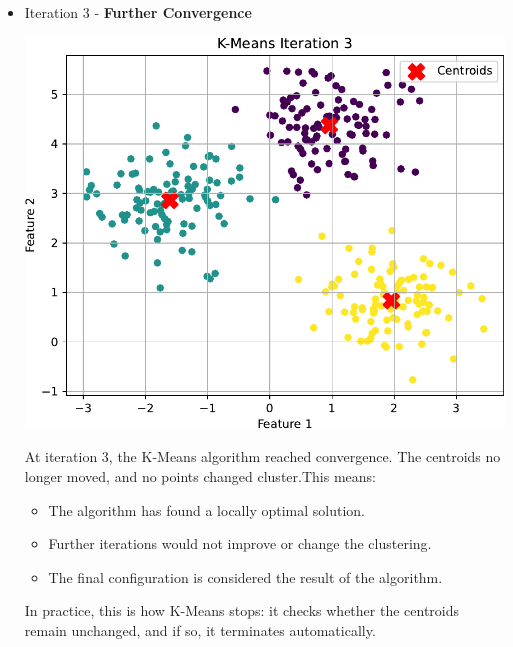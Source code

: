 \begin{examplebox}[: K-Means]
\begin{itemize}
        \item Iteration 3 - \textbf{Further Convergence}
        \begin{center}
            \includegraphics[width=.7\textwidth]{img/k-means/iter_3.pdf}
        \end{center}
        At iteration 3, the K-Means algorithm reached convergence. The centroids no longer moved, and no points changed cluster.This means:
        \begin{itemize}
            \item The algorithm has found a locally optimal solution.
            \item Further iterations would not improve or change the clustering.
            \item The final configuration is considered the result of the algorithm.
        \end{itemize}
        In practice, this is how K-Means stops: it checks whether the centroids remain unchanged, and if so, it terminates automatically.
    \end{itemize}
\end{examplebox}
